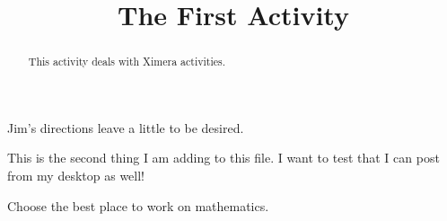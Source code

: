 \documentclass{ximera}
\title{The First Activity}
\begin{document}
  
	\begin{abstract}  
		This activity deals with Ximera activities.  
	\end{abstract}  
	\maketitle  
	Jim's directions leave a little to be desired.  
	
	This is the second thing I am adding to this file.  I want to test that I can post from my desktop as well!
	\begin{exercise}  
		Choose the best place to work on mathematics.  
		\begin{multipleChoice}  
		\end{multipleChoice}  
	\end{exercise}  
\end{document}
